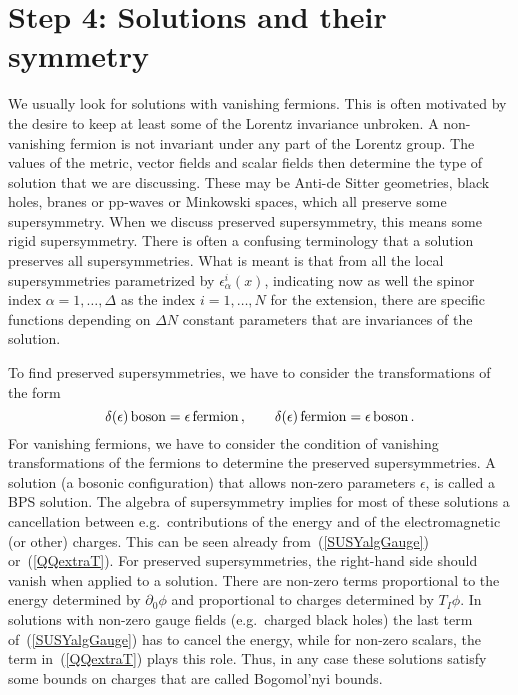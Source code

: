 \documentclass[a4paper,11pt,twoside]{article}
\newcommand{\OliveGreen}[1]{#1}
\begin{document}
\section{Step 4: Solutions and their symmetry} \label{ss:solutions}

We usually look for solutions with vanishing fermions. This is often
motivated by the desire to keep at least some of the Lorentz invariance
unbroken. A non-vanishing fermion is not invariant under any part of the
Lorentz group. The values of the metric, vector fields and scalar fields
then determine the type of solution that we are discussing. These may be
Anti-de Sitter geometries, black holes, branes or pp-waves or Minkowski
spaces, which all preserve some supersymmetry. When we discuss preserved
supersymmetry, this means some rigid supersymmetry. There is often a
confusing terminology that a solution preserves all supersymmetries. What
is meant is that from all the local supersymmetries parametrized by
$\OliveGreen{\epsilon^i_\alpha} (x)$, indicating now as well the spinor
index $\alpha=1,\ldots ,\Delta $ as the index $i=1,\ldots, N$ for the
extension, there are specific functions depending on $\Delta N$ constant
parameters that are invariances of the solution.

To find preserved supersymmetries, we have to consider the
transformations of the form
\begin{equation}
  \delta (\OliveGreen{\epsilon })\,{\rm boson}=\OliveGreen{\epsilon
  }\,\textrm{fermion}\,,\qquad
\delta (\OliveGreen{\epsilon })\,{\rm fermion}=\OliveGreen{\epsilon
  }\,\textrm{boson}\,.
 \label{delbosonfermion}
\end{equation}
For vanishing fermions, we have to consider the condition of vanishing
transformations of the fermions to determine the preserved
supersymmetries. A solution (a bosonic configuration) that allows
non-zero parameters $\OliveGreen{\epsilon }$, is called a BPS solution.
The algebra of supersymmetry implies for most of these solutions a
cancellation between e.g.\ contributions of the energy and of the
electromagnetic (or other) charges. This can be seen already
from~(\ref{SUSYalgGauge}) or~(\ref{QQextraT}). For preserved
supersymmetries, the right-hand side should vanish when applied to a
solution. There are non-zero terms proportional to the energy determined
by $\partial _0\phi $ and proportional to charges determined by $T_I\phi
$. In solutions with non-zero gauge fields (e.g.\ charged black holes)
the last term of~(\ref{SUSYalgGauge}) has to cancel the energy, while for
non-zero scalars, the term in~(\ref{QQextraT}) plays this role. Thus, in
any case these solutions satisfy some bounds on charges that are called
Bogomol'nyi bounds.
\end{document}
